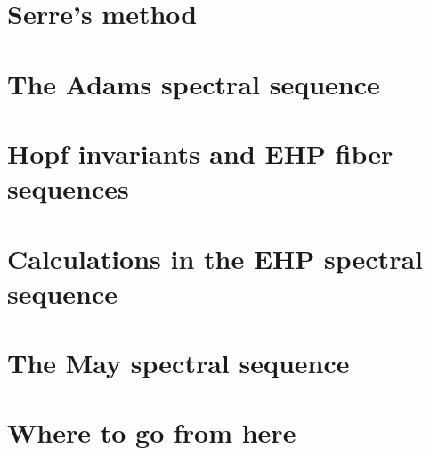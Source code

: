 \documentclass{amsart}
\theoremstyle{plain}
\theoremstyle{definition}
\theoremstyle{remark}
\begin{document}
\section{Serre's method}




\section{The Adams spectral sequence}




\section{Hopf invariants and EHP fiber sequences}




\section{Calculations in the EHP spectral sequence}




\section{The May spectral sequence}




\section{Where to go from here}
\end{document}
